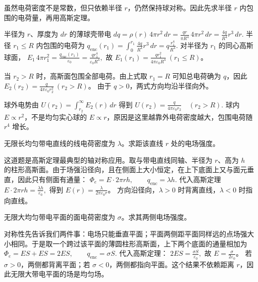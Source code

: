 \documentclass[lang=cn,11pt]{elegantbook}
\begin{document}
\begin{solution}
虽然电荷密度不是常数，但只依赖半径 \(r\)，仍然保持球对称。因此先求半径 \(r\) 内包围的电荷量，再用高斯定理。

半径为 \(r\)、厚度为 \(dr\) 的薄球壳带电
 \(dq=\rho(r)\,4\pi r^2\,dr =\frac{qr}{\pi R^4}\,4\pi r^2\,dr =\frac{4q}{R^4}r^3\,dr.\) 
半径 \(r_1\le R\) 内包围的电荷为
 \(q_{\mathrm{enc}}(r_1)= \int_0^{r_1}\frac{4q}{R^4}r^3\,dr =q\frac{r_1^4}{R^4}.\) 
对半径为 \(r_1\) 的同心高斯球面，
 \(E_1\,4\pi r_1^2 =\frac{q_{\mathrm{enc}}(r_1)}{\varepsilon_0} =\frac{q r_1^4}{\varepsilon_0 R^4},\) 
故 \(E_1(r_1)=\frac{q r_1^2}{4\pi\varepsilon_0 R^4}\ (r_1\le R)\)。

当 \(r_2>R\) 时，高斯面包围全部电荷。由上式取 \(r_1=R\) 可知总电荷确为 \(q\)，因此
\(E_2(r_2)=\frac{q}{4\pi\varepsilon_0 r_2^2}\ (r_2>R)\)。
由于 \(q>0\)，两式方向均沿半径向外。

球外电势由
 \(U(r_2)=\int_{r_2}^{\infty} E_2(r)\,dr\) 
得到
 \(U(r_2)=\frac{q}{4\pi\varepsilon_0 r_2}\quad (r_2>R).\) 
球内 \(E\propto r^2\)，不是均匀实心球的 \(E\propto r\)，原因是这里越靠外电荷密度越大，包围电荷随 \(r^4\) 增长。
\end{solution}

\begin{exercise}[无限长均匀带电直线的场强]
无限长均匀带电直线的线电荷密度为 \(\lambda\)。求距该直线 \(r\) 处的电场强度。
\end{exercise}

\begin{solution}
这道题是高斯定理最典型的轴对称应用。取与带电直线同轴、半径为 \(r\)、高为 \(h\) 的柱形高斯面。由于场强沿径向，且在侧面上大小恒定，在上下底面上又与面元垂直，因此只有侧面有通量：
 \(\Phi_e=E\cdot 2\pi rh,\qquad q_{\mathrm{enc}}=\lambda h.\) 
代入高斯定理
 \(E\cdot 2\pi rh=\frac{\lambda h}{\varepsilon_0},\) 
得到
\(E(r)=\frac{\lambda}{2\pi\varepsilon_0 r}\)。
方向沿径向，\(\lambda>0\) 时背离直线，\(\lambda<0\) 时指向直线。
\end{solution}

\begin{exercise}[无限大均匀带电平面的场强]
无限大均匀带电平面的面电荷密度为 \(\sigma\)。求其两侧电场强度。
\end{exercise}

\begin{solution}
对称性先告诉我们两件事：电场只能垂直平面；平面两侧距平面同样远的点场强大小相同。于是取一个跨过该平面的薄圆柱形高斯面，上下两个底面的通量相加为
 \(\Phi_e=ES+ES=2ES,\qquad q_{\mathrm{enc}}=\sigma S.\) 
代入高斯定理：
 \(2ES=\frac{\sigma S}{\varepsilon_0},\) 
故 \(E=\frac{\sigma}{2\varepsilon_0}\)。
若 \(\sigma>0\)，两侧都背离平面；若 \(\sigma<0\)，两侧都指向平面。这个结果不依赖距离 \(r\)，因此无限大带电平面的场是均匀场。
\end{solution}
\end{document}

